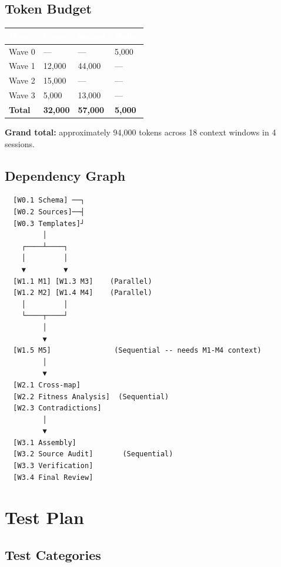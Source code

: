 \documentclass[11pt,letterpaper]{article}
\newcommand{\tableheader}[1]{\textbf{\sffamily\textcolor{white}{#1}}}
\begin{document}
\subsection{Token Budget}

\begin{center}
\begin{tabularx}{\textwidth}{L{4cm}C{2cm}C{2cm}C{2cm}}
\toprule
{}
\tableheader{Wave} & \tableheader{Opus} & \tableheader{Sonnet} & \tableheader{Haiku} \\
\midrule
Wave 0 & --- & --- & 5,000 \\
Wave 1 & 12,000 & 44,000 & --- \\
Wave 2 & 15,000 & --- & --- \\
Wave 3 & 5,000 & 13,000 & --- \\
\midrule
\textbf{Total} & \textbf{32,000} & \textbf{57,000} & \textbf{5,000} \\
\bottomrule
\end{tabularx}
\end{center}

\textbf{Grand total:} approximately 94,000 tokens across 18 context windows in 4 sessions.

\subsection{Dependency Graph}

\begin{asciibox}
\begin{verbatim}
  [W0.1 Schema] ──┐
  [W0.2 Sources]──┤
  [W0.3 Templates]┘
         │
    ┌────┴────┐
    │         │
    ▼         ▼
  [W1.1 M1] [W1.3 M3]    (Parallel)
  [W1.2 M2] [W1.4 M4]    (Parallel)
    │         │
    └────┬────┘
         │
         ▼
  [W1.5 M5]               (Sequential -- needs M1-M4 context)
         │
         ▼
  [W2.1 Cross-map]
  [W2.2 Fitness Analysis]  (Sequential)
  [W2.3 Contradictions]
         │
         ▼
  [W3.1 Assembly]
  [W3.2 Source Audit]       (Sequential)
  [W3.3 Verification]
  [W3.4 Final Review]
\end{verbatim}
\end{asciibox}

\section{Test Plan}

\subsection{Test Categories}
\end{document}
